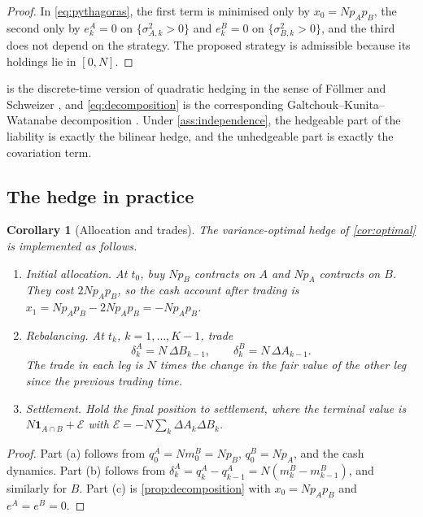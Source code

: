 \documentclass[11pt,a4paper]{article}
\theoremstyle{plain}
\newtheorem{corollary}[theorem]{Corollary}
\theoremstyle{definition}
\theoremstyle{remark}
\newcommand{\1}{\mathbf{1}}
\begin{document}
\begin{proof}
In \eqref{eq:pythagoras}, the first term is minimised only by $x_0 = Np_Ap_B$, the second only by $e^A_k = 0$ on $\{\sigma^2_{A,k}>0\}$ and $e^B_k=0$ on $\{\sigma^2_{B,k}>0\}$, and the third does not depend on the strategy. The proposed strategy is admissible because its holdings lie in $[0,N]$.
\end{proof}

 is the discrete-time version of quadratic hedging in the sense of Föllmer and Schweizer \cite{FollmerSchweizer1991,Schweizer1995}, and \eqref{eq:decomposition} is the corresponding Galtchouk--Kunita--Watanabe decomposition \cite{KunitaWatanabe1967}. Under \cref{ass:independence}, the hedgeable part of the liability is exactly the bilinear hedge, and the unhedgeable part is exactly the covariation term.

\subsection{The hedge in practice}

\begin{corollary}[Allocation and trades]
\label{cor:trades}
The variance-optimal hedge of \cref{cor:optimal} is implemented as follows.
\begin{enumerate}[label=(\alph*)]
  \item \emph{Initial allocation.} At $t_0$, buy $Np_B$ contracts on $A$ and $Np_A$ contracts on $B$. They cost $2Np_Ap_B$, so the cash account after trading is $x_1 = Np_Ap_B - 2Np_Ap_B = -Np_Ap_B$.
  \item \emph{Rebalancing.} At $t_k$, $k=1,\dots,K-1$, trade
  \[
  \delta^A_k = N\,\Delta B_{k-1},\qquad \delta^B_k = N\,\Delta A_{k-1}.
  \]
  The trade in each leg is $N$ times the change in the fair value of the \emph{other} leg since the previous trading time.
  \item \emph{Settlement.} Hold the final position to settlement, where the terminal value is $N\1_{A\cap B} + \mathcal{E}$ with $\mathcal{E} = -N\sum_k\Delta A_k\Delta B_k$.
\end{enumerate}
\end{corollary}

\begin{proof}
Part (a) follows from $q^A_0 = Nm^B_0 = Np_B$, $q^B_0 = Np_A$, and the cash dynamics. Part (b) follows from $\delta^A_k = q^A_k - q^A_{k-1} = N(m^B_k - m^B_{k-1})$, and similarly for $B$. Part (c) is \cref{prop:decomposition} with $x_0 = Np_Ap_B$ and $e^A = e^B = 0$.
\end{proof}
\end{document}

